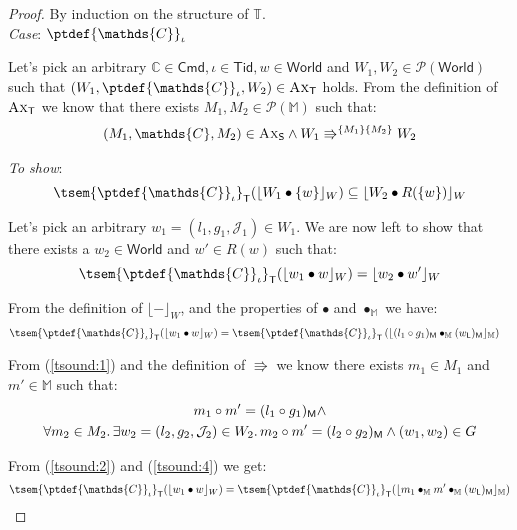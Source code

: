 {\parindent0pt
\begin{proof}
By induction on the structure of $\mathds{T}$. \\	

\textit{Case}: $\ptdef{\mathds{C}}_\iota$

Let's pick an arbitrary $\mathds{C} \in \mathsf{Cmd}, \iota \in \mathsf{Tid}, w \in \mathsf{World}$ and $W_1, W_2 \in \mathcal{P}(\mathsf{World})$ such that $(W_1, \ptdef{\mathds{C}}_\iota, W_2) \in \textsc{Ax}_\mathsf{T}$ holds. From the definition of $\textsc{Ax}_\mathsf{T}$ we know that there exists $M_1, M_2 \in \mathcal{P}(\mathbb{M})$ such that:
\begin{gather}\label{tsound:1}
	(M_1, \mathds{C}, M_2) \in \textsc{Ax}_\mathsf{S} \land W_1 \Rrightarrow^{\{M_1\}\{M_2\}} W_2
\end{gather}

\textit{To show}:
\[
	\tsem{\ptdef{\mathds{C}}_\iota}_\mathsf{T}(\lfloor W_1 \bullet \{w\} \rfloor_W) \subseteq \lfloor W_2 \bullet R(\{w\}) \rfloor_W
\]

Let's pick an arbitrary $w_1 = (l_1, g_1, \mathcal{J}_1) \in W_1$. We are now left to show that there exists a $w_2 \in \mathsf{World}$ and $w' \in R(w)$ such that:
\[
	\tsem{\ptdef{\mathds{C}}_\iota}_\mathsf{T}(\lfloor w_1 \bullet w \rfloor_W) = \lfloor w_2 \bullet w' \rfloor_W
\]

From the definition of $\lfloor - \rfloor_W$, and the properties of $\bullet$ and $\bullet_\mathbb{M}$ we have:
\begin{align}\label{tsound:2}
\tsem{\ptdef{\mathds{C}}_\iota}_\mathsf{T}(\lfloor w_1 \bullet w \rfloor_W) &=
\tsem{\ptdef{\mathds{C}}_\iota}_\mathsf{T}\left( \lfloor (l_1 \circ g_1)_\mathsf{M} \bullet_\mathbb{M} (w_\mathsf{L})_\mathsf{M} \rfloor_\mathbb{M} \right)
\end{align}

From (\ref{tsound:1}) and the definition of $\Rrightarrow$ we know there exists $m_1 \in M_1$ and $m' \in \mathbb{M}$ such that:
\begin{gather}
\label{tsound:3} m_1 \circ m' = (l_1 \circ g_1)_\mathsf{M} \land \\
\label{tsound:4} \forall m_2 \in M_2 \ldotp \exists w_2 = (l_2, g_2, \mathcal{J}_2) \in W_2 \ldotp m_2 \circ m' = (l_2 \circ g_2)_\mathsf{M} \land (w_1, w_2) \in G
\end{gather}

From (\ref{tsound:2}) and (\ref{tsound:4}) we get:
\begin{gather}\label{tsound:5}
\tsem{\ptdef{\mathds{C}}_\iota}_\mathsf{T}(\lfloor w_1 \bullet w \rfloor_W) =
\tsem{\ptdef{\mathds{C}}_\iota}_\mathsf{T}(\lfloor m_1 \bullet_\mathbb{M} m' \bullet_\mathbb{M} (w_\mathsf{L})_\mathsf{M} \rfloor_\mathbb{M})
\end{gather}


\end{proof}}
